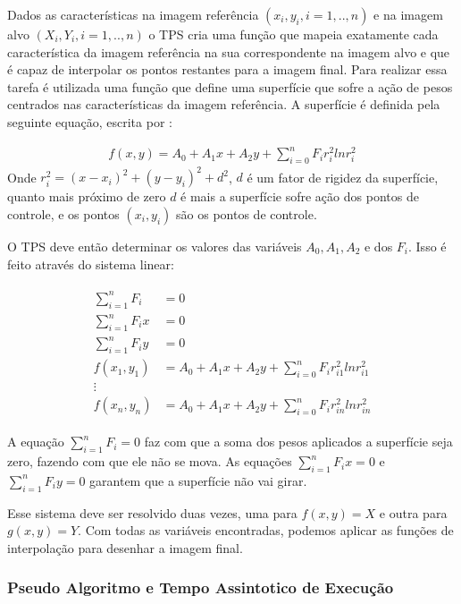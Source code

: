     Dados as características na imagem referência $(x_i,y_i, i=1,..,n)$ e na imagem alvo $(X_i,Y_i, i=1,..,n)$
o TPS cria uma função que mapeia exatamente cada característica da imagem referência na sua
correspondente na imagem alvo e que é capaz de interpolar os pontos restantes para a imagem final. Para realizar
essa tarefa é utilizada uma função que define uma superfície que sofre a ação de pesos centrados nas
características da imagem referência. A superfície é definida pela seguinte equação, escrita por \cite{bookstein1989principal}:

\begin{align}\label{math:tps}
    f(x,y) = A_0 + A_1x + A_2y + \sum_{i=0}^n F_i r_i^2 ln r_i^2
\end{align}
Onde $r_i^2 = (x-x_i)^2 + (y-y_i)^2 + d^2$, $d$ é um fator de rigidez da superfície, quanto mais próximo de 
zero $d$ é mais a superfície sofre ação dos pontos de controle, e os pontos $(x_i, y_i)$ são os pontos de controle.

    O TPS deve então determinar os valores das variáveis $A_0, A_1, A_2$ e dos $F_i$. 
Isso é feito através do sistema linear:

\begin{align}
\begin{split}
    \sum_{i=1}^n F_i &= 0 \\
    \sum_{i=1}^n F_ix &= 0 \\
    \sum_{i=1}^n F_iy &= 0 \\
    f(x_1,y_1) &= A_0 + A_1x + A_2y + \sum_{i=0}^n F_i r_{i1}^2 ln r_{i1}^2 \\
    \vdots \\
    f(x_n,y_n) &= A_0 + A_1x + A_2y + \sum_{i=0}^n F_i r_{in}^2 ln r_{in}^2
\end{split}
\end{align}

A equação $\sum_{i=1}^n F_i = 0$ faz com que a soma dos pesos aplicados a superfície seja zero, fazendo com que
ele não se mova. As equações $\sum_{i=1}^n F_ix = 0$ e $\sum_{i=1}^n F_iy = 0$ garantem que a superfície não vai girar.

    Esse sistema deve ser resolvido duas vezes, uma para $f(x,y) = X$ e outra para $g(x,y) = Y$. Com todas as variáveis
encontradas, podemos aplicar as funções de interpolação para desenhar a imagem final.

\subsubsection{Pseudo Algoritmo e Tempo Assintotico de Execução}

